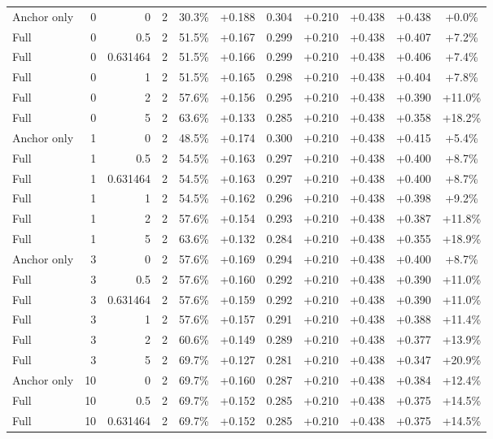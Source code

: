 \begin{table}[htbp]
\begin{tabular}{lrrrccccccc}
Anchor only & 0 & 0 & 2 & 30.3\% & +0.188 & 0.304 & +0.210 & +0.438 & +0.438 & +0.0\% \\
Full & 0 & 0.5 & 2 & 51.5\% & +0.167 & 0.299 & +0.210 & +0.438 & +0.407 & +7.2\% \\
Full & 0 & 0.631464 & 2 & 51.5\% & +0.166 & 0.299 & +0.210 & +0.438 & +0.406 & +7.4\% \\
Full & 0 & 1 & 2 & 51.5\% & +0.165 & 0.298 & +0.210 & +0.438 & +0.404 & +7.8\% \\
Full & 0 & 2 & 2 & 57.6\% & +0.156 & 0.295 & +0.210 & +0.438 & +0.390 & +11.0\% \\
Full & 0 & 5 & 2 & 63.6\% & +0.133 & 0.285 & +0.210 & +0.438 & +0.358 & +18.2\% \\
Anchor only & 1 & 0 & 2 & 48.5\% & +0.174 & 0.300 & +0.210 & +0.438 & +0.415 & +5.4\% \\
Full & 1 & 0.5 & 2 & 54.5\% & +0.163 & 0.297 & +0.210 & +0.438 & +0.400 & +8.7\% \\
Full & 1 & 0.631464 & 2 & 54.5\% & +0.163 & 0.297 & +0.210 & +0.438 & +0.400 & +8.7\% \\
Full & 1 & 1 & 2 & 54.5\% & +0.162 & 0.296 & +0.210 & +0.438 & +0.398 & +9.2\% \\
Full & 1 & 2 & 2 & 57.6\% & +0.154 & 0.293 & +0.210 & +0.438 & +0.387 & +11.8\% \\
Full & 1 & 5 & 2 & 63.6\% & +0.132 & 0.284 & +0.210 & +0.438 & +0.355 & +18.9\% \\
Anchor only & 3 & 0 & 2 & 57.6\% & +0.169 & 0.294 & +0.210 & +0.438 & +0.400 & +8.7\% \\
Full & 3 & 0.5 & 2 & 57.6\% & +0.160 & 0.292 & +0.210 & +0.438 & +0.390 & +11.0\% \\
Full & 3 & 0.631464 & 2 & 57.6\% & +0.159 & 0.292 & +0.210 & +0.438 & +0.390 & +11.0\% \\
Full & 3 & 1 & 2 & 57.6\% & +0.157 & 0.291 & +0.210 & +0.438 & +0.388 & +11.4\% \\
Full & 3 & 2 & 2 & 60.6\% & +0.149 & 0.289 & +0.210 & +0.438 & +0.377 & +13.9\% \\
Full & 3 & 5 & 2 & 69.7\% & +0.127 & 0.281 & +0.210 & +0.438 & +0.347 & +20.9\% \\
Anchor only & 10 & 0 & 2 & 69.7\% & +0.160 & 0.287 & +0.210 & +0.438 & +0.384 & +12.4\% \\
Full & 10 & 0.5 & 2 & 69.7\% & +0.152 & 0.285 & +0.210 & +0.438 & +0.375 & +14.5\% \\
Full & 10 & 0.631464 & 2 & 69.7\% & +0.152 & 0.285 & +0.210 & +0.438 & +0.375 & +14.5\% \\

\end{tabular}
\end{table}
